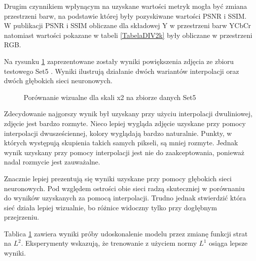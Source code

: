 \documentclass[a4paper,12pt,twoside,openany]{report}
\newcommand{\ImgPath}{.}
\begin{document}
	Drugim czynnikiem wpłynącym na uzyskane wartości metryk mogła być zmiana przestrzeni barw, na podstawie której były pozyskiwane wartości PSNR i SSIM. W publikacji PSNR i SSIM obliczane dla składowej Y w przestrzeni barw YCbCr natomiast wartości pokazane w tabeli \ref{TabelaDIV2k} były obliczane w przestrzeni RGB.
	
	Na rysunku \ref{fig:DIv2k} zaprezentowane zostały wyniki powiększenia zdjęcia ze zbioru testowego Set5 \cite{Set5}. Wyniki ilustrują działanie dwóch wariantów interpolacji oraz dwóch głębokich sieci neuronowych.
	
	\begin{figure}[!htbp]
		\centering
		\caption{Porównanie wizualne dla skali  x2 na zbiorze danych Set5}
		\label{fig:DIv2k}
	\end{figure}
	
	Zdecydowanie najgorszy wynik był uzyskany przy użyciu interpolacji dwuliniowej, zdjęcie jest bardzo rozmyte. Nieco lepiej wygląda zdjęcie uzyskane przy pomocy interpolacji dwusześciennej, kolory wyglądają bardzo naturalnie. Punkty, w których występują skupienia takich samych pikseli, są mniej rozmyte. Jednak wynik uzyskany przy pomocy interpolacji jest nie do zaakceptowania, ponieważ nadal rozmycie jest zauważalne.
	
	Znacznie lepiej prezentują się wyniki uzyskane przy pomocy głębokich sieci neuronowych. Pod względem ostrości obie sieci radzą skuteczniej w porównaniu do wyników uzyskanych za pomocą interpolacji. Trudno jednak stwierdzić która sieć działa lepiej wizualnie, bo różnice widoczny tylko przy dogłębnym przejrzeniu.
	
	Tablica \ref{fig:DIv2k} zawiera wyniki próby udoskonalenie modelu przez zmianę funkcji strat na $L^2$. Eksperymenty wskazują, że trenowanie z użyciem normy $L^1$ osiąga lepsze wyniki.
	\newpage
\end{document}
